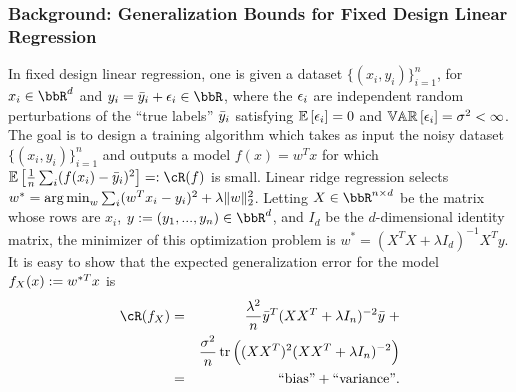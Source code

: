 \subsubsection{Background: Generalization Bounds for Fixed Design Linear Regression}
In fixed design linear regression, one is given a dataset $\{(x_i,y_i)\}_{i=1}^n$, for $x_i \in \RR^d$ and $y_i = \by_i + \eps_i \in \RR$, where the $\eps_i$ are independent random perturbations of the ``true labels'' $\by_i$ satisfying $\expect{}{\eps_i} = 0$ and $\var{}{\eps_i} = \sigma^2 < \infty$.
The goal is to design a training algorithm which takes as input the noisy dataset $\{(x_i,y_i)\}_{i=1}^n$ and outputs a model $f(x) = w^T x$ for which $\expect{}{\frac{1}{n}\sum_i (f(x_i) -\by_i)^2} \eqdef \cR(f)$ is small.
Linear ridge regression selects $w^* = \argmin_w \sum_i (w^T x_i - y_i)^2 + \lambda\|w\|_2^2$.
Letting $X \in \RR^{n\times d}$ be the matrix whose rows are $x_i$, $y \defeq (y_1,...,y_n) \in \RR^d$, and $I_d$ be the $d$-dimensional identity matrix, the minimizer of this optimization problem is $w^* = ( X^T X + \lambda I_d)^{-1}X^Ty$.
It is easy to show \citep{alaoui15} that the expected generalization error for the model $f_X(x) \defeq w^{*T}x$ is
\begin{eqnarray*}
\cR(f_X) &=& \frac{\lambda^2}{n} \by^T(XX^T + \lambda I_n)^{-2}\by \; +\\ && \frac{\sigma^2}{n}\tr\Big((XX^T)^2(XX^T + \lambda I_n)^{-2}\Big)\\
&=& \text{``bias''} + \text{``variance''}.
\end{eqnarray*}

